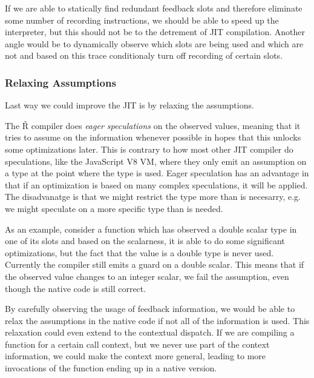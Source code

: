 If we are able to statically find redundant feedback slots and therefore eliminate some number of recording instructions, we should be able to speed up the interpreter, but this should not be to the detrement of JIT compilation. Another angle would be to dynamically observe which slots are being used and which are not and based on this trace conditionaly turn off recording of certain slots.

\subsubsection*{Relaxing Assumptions}

Last way we could improve the JIT is by relaxing the assumptions.

The Ř compiler does \textit{eager speculations} on the observed values, meaning that it tries to assume on the information whenever possible in hopes that this unlocks some optimizations later. This is contrary to how most other JIT compiler do speculations, like the JavaScript V8 VM\cite{v8}, where they only emit an assumption on a type at the point where the type is used. Eager speculation has an advantage in that if an optimization is based on many complex speculations, it will be applied. The disadvanatge is that we might restrict the type more than is necesarry, e.g. we might speculate on a more specific type than is needed.

As an example, consider a function which has observed a double scalar type in one of its slots and based on the scalarness, it is able to do some significant optimizations, but the fact that the value is a double type is never used. Currently the compiler still emits a guard on a double scalar. This means that if the observed value changes to an integer scalar, we fail the assumption, even though the native code is still correct.

By carefully observing the usage of feedback information, we would be able to relax the assumptions in the native code if not all of the information is used. This relaxation could even extend to the contextual dispatch. If we are compiling a function for a certain call context, but we never use part of the context information, we could make the context more general, leading to more invocations of the function ending up in a native version.

